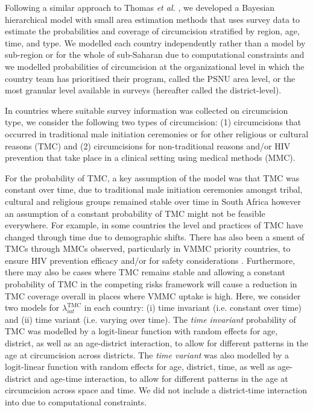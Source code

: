 \documentclass{article}
\begin{document}

Following a similar approach to Thomas {\it et al.} \cite{thomas2021multilevel}, we developed a Bayesian hierarchical model with small area estimation methods that uses survey data to estimate the probabilities and coverage of circumcision stratified by region, age, time, and type. We modelled each country independently rather than a model by sub-region or for the whole of sub-Saharan due to computational constraints and we modelled probabilities of circumcision at the organizational level in which the country team has prioritised their program, called the PSNU area level, or the most granular level available in surveys (hereafter called the district-level). 

In countries where suitable survey information was collected on circumcision type, we consider the following two types of circumcision: (1) circumcisions that occurred in traditional male initiation ceremonies or for other religious or cultural reasons (TMC) and (2) circumcisions for non-traditional reasons and/or HIV prevention that take place in a clinical setting using medical methods (MMC). 

For the probability of TMC, a key assumption of the \cite{thomas2021multilevel} model was that TMC was constant over time, due to traditional male initiation ceremonies amongst tribal, cultural and religious groups remained stable over time in South Africa however an assumption of a constant probability of TMC might not be feasible everywhere. For example, in some countries the level and practices of TMC have changed through time due to demographic shifts. There has also been a sment of TMCs through MMCs observed, particularly in VMMC priority countries, to ensure HIV prevention efficacy and/or for safety considerations \cite{thomas2021multilevel}. Furthermore, there may also be cases where TMC remains stable and allowing a constant probability of TMC in the competing risks framework will cause a reduction in TMC coverage overall in places where VMMC uptake is high. Here, we consider two models for $\lambda^{\text{TMC}}_{iat}$ in each country: (i) time invariant (i.e. constant over time) and (ii) time variant (i.e. varying over time). The {\it time invariant} probability of TMC was modelled by a logit-linear function with random effects for age, district, as well as an age-district interaction, to allow for different patterns in the age at circumcision across districts. The {\it time variant} was also modelled by a logit-linear function with random effects for age, district, time, as well as age-district and age-time interaction, to allow for different patterns in the age at circumcision across space and time. We did not include a district-time interaction into due to computational constraints. 
\end{document}
